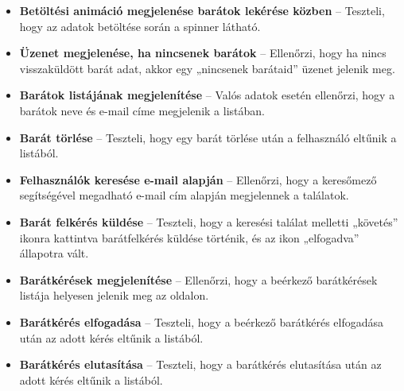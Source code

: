 \documentclass[12pt]{report}
\begin{document}
\begin{itemize}
  \item \textbf{Betöltési animáció megjelenése barátok lekérése közben} – Teszteli, hogy az adatok betöltése során a spinner látható.
  \item \textbf{Üzenet megjelenése, ha nincsenek barátok} – Ellenőrzi, hogy ha nincs visszaküldött barát adat, akkor egy „nincsenek barátaid” üzenet jelenik meg.
  \item \textbf{Barátok listájának megjelenítése} – Valós adatok esetén ellenőrzi, hogy a barátok neve és e-mail címe megjelenik a listában.
  \item \textbf{Barát törlése} – Teszteli, hogy egy barát törlése után a felhasználó eltűnik a listából.
  \item \textbf{Felhasználók keresése e-mail alapján} – Ellenőrzi, hogy a keresőmező segítségével megadható e-mail cím alapján megjelennek a találatok.
  \item \textbf{Barát felkérés küldése} – Teszteli, hogy a keresési találat melletti „követés” ikonra kattintva barátfelkérés küldése történik, és az ikon „elfogadva” állapotra vált.
  \item \textbf{Barátkérések megjelenítése} – Ellenőrzi, hogy a beérkező barátkérések listája helyesen jelenik meg az oldalon.
  \item \textbf{Barátkérés elfogadása} – Teszteli, hogy a beérkező barátkérés elfogadása után az adott kérés eltűnik a listából.
  \item \textbf{Barátkérés elutasítása} – Teszteli, hogy a barátkérés elutasítása után az adott kérés eltűnik a listából.
\end{itemize}
\end{document}
